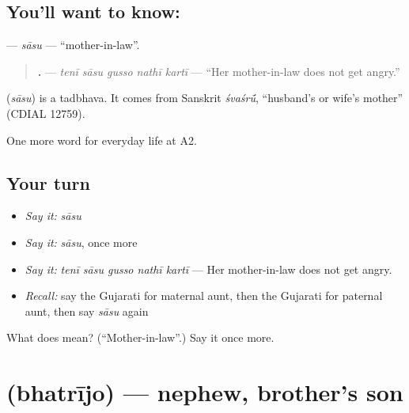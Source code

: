 \subsection*{You'll want to know: }
\textbf{} — \emph{sāsu} — \textquotedblleft{}mother-in-law\textquotedblright{}.

\begin{quote}
\textbf{    .} — \emph{tenī sāsu gusso nathī kartī} — \textquotedblleft{}Her mother-in-law does not get angry.\textquotedblright{}
\end{quote}

\begin{cousinweb}
\textbf{} (\emph{sāsu}) is a tadbhava. It comes from Sanskrit \emph{śvaśrū́}, \textquotedblleft{}husband's or wife's mother\textquotedblright{} (CDIAL 12759).
\end{cousinweb}

\begin{grammarlens}[title={What you've built}]
One more word for everyday life at A2.
\end{grammarlens}

\subsection*{Your turn}
\begin{itemize}
\raggedright
  \item \emph{Say it:} \emph{sāsu}
  \item \emph{Say it:} \emph{sāsu}, once more
  \item \emph{Say it:} \emph{tenī sāsu gusso nathī kartī} — Her mother-in-law does not get angry.
  \item \emph{Recall:} say the Gujarati for maternal aunt, then the Gujarati for paternal aunt, then say \emph{sāsu} again
\end{itemize}

\begin{tcolorbox}[breakable,colback=teal!4,colframe=teal!35!black,title={Before you move on}]
What does  mean? (\textquotedblleft{}Mother-in-law\textquotedblright{}.) Say it once more.
\end{tcolorbox}
\section[\texorpdfstring{\gu{ભત્રીજો} (bhatrījo)}{ભત્રીજો (bhatrījo)}]{ (bhatrījo) — nephew, brother's son}

